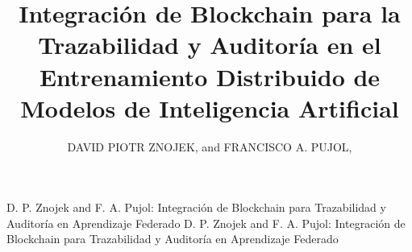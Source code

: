 \documentclass{ieeeaccess}
\begin{document}

\title{Integración de Blockchain para la Trazabilidad y Auditoría en el Entrenamiento Distribuido de Modelos de Inteligencia Artificial}

\author{\uppercase{David Piotr Znojek}, and
\uppercase{Francisco A. Pujol}, }

\address[1]{Departamento de Tecnología Informática y Computación, Escuela Politécnica Superior, Universidad de Alicante, 03690 San Vicente del Raspeig, Alicante, España (e-mail: dawidznojek@gmail.com, fpujol@ua.es)}
\tfootnote{}

\markboth
{D. P. Znojek and F. A. Pujol: Integración de Blockchain para Trazabilidad y Auditoría en Aprendizaje Federado}
{D. P. Znojek and F. A. Pujol: Integración de Blockchain para Trazabilidad y Auditoría en Aprendizaje Federado}

\end{document}
